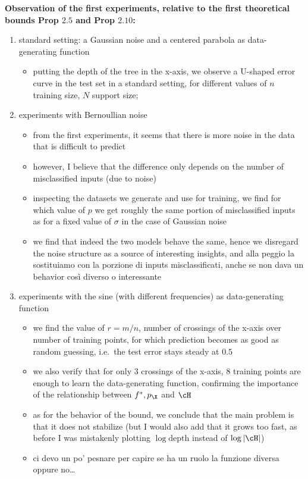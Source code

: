 {\bf Observation of the first experiments, relative to the first theoretical bounds Prop $2.5$ and Prop $2.10$:}

\begin{enumerate}
    \item standard setting: a Gaussian noise and a centered parabola as data-generating function
\begin{itemize}
    \item putting the depth of the tree in the x-axis, we observe a U-shaped error curve in the test set in a standard setting, for different values of $n$ training size, $N$ support size;
\end{itemize}
    \item experiments with Bernoullian noise
    \begin{itemize}
        \item from the first experiments, it seems that there is more noise in the data that is difficult to predict 
        \item however, I believe that the difference only depends on the number of misclassified inputs (due to noise)
        \item inspecting the datasets we generate and use for training, we find for which value of $p$ we get roughly the same portion of misclassified inputs as for a fixed value of $\sigma$ in the case of Gaussian noise
        \item we find that indeed the two models behave the same, hence we disregard the noise structure as a source of interesting insights, and alla peggio la sostituiamo con la porzione di inputs misclassificati, anche se non dava un behavior così diverso o interessante
    \end{itemize}
    \item experiments with the sine (with different frequencies) as data-generating function
    \begin{itemize}
        \item we find the value of $r = m/n$, number of crossings of the x-axis over number of training points, for which prediction becomes as good as random guessing, i.e.\ the test error stays steady at $0.5$
        \item we also verify that for only $3$ crossings of the x-axis, $8$ training points are enough to learn the data-generating function, confirming the importance of the relationship between $f^*, p_\X$ and $\cH$
        \item as for the behavior of the bound, we conclude that the main problem is that it does not stabilize (but I would also add that it grows too fast, as before I was mistakenly plotting $\log \mathrm{depth}$ instead of $\log \vert \cH\vert$)
        \item ci devo un po' pesnare per capire se ha un ruolo la funzione diversa oppure no\dots
    \end{itemize}
\end{enumerate}


